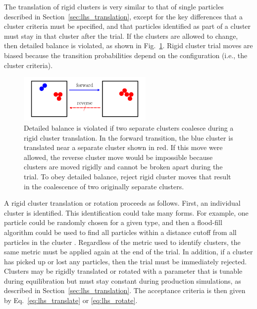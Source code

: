 \documentclass[
  9pt,
  bestpractices,
]{livecoms}
\begin{document}
The translation of rigid clusters is very similar to that of single particles described in Section~\ref{sec:lhs_translation}, except for the key differences that a cluster criteria must be specified, and that particles identified as part of a cluster must stay in that cluster after the trial.
If the clusters are allowed to change, then detailed balance is violated, as shown in Fig.~\ref{fig:cluster}.
Rigid cluster trial moves are biased because the transition probabilities depend on the configuration (i.e., the cluster criteria).

\begin{figure}
\begin{centering}
\includegraphics[width=6.5cm]{../figures/cluster.pdf}
\caption{
Detailed balance is violated if two separate clusters coalesce during a rigid cluster translation.
In the forward transition, the blue cluster is translated near a separate cluster shown in red.
If this move were allowed, the reverse cluster move would be impossible because clusters are moved rigidly and cannot be broken apart during the trial.
To obey detailed balance, reject rigid cluster moves that result in the coalescence of two originally separate clusters.
}
\label{fig:cluster}
\end{centering}
\end{figure}

A rigid cluster translation or rotation proceeds as follows.
First, an individual cluster is identified.
This identification could take many forms.
For example, one particle could be randomly chosen for a given type, and then a flood-fill algorithm could be used to find all particles within a distance cutoff from all particles in the cluster \cite{hatch_self-assembly_2016}.
Regardless of the metric used to identify clusters, the same metric must be applied again at the end of the trial.
In addition, if a cluster has picked up or lost any particles, then the trial must be immediately rejected.
Clusters may be rigidly translated or rotated with a parameter that is tunable during equilibration but must stay constant during production simulations, as described in Section~\ref{sec:lhs_translation}.
The acceptance criteria is then given by Eq.~\ref{eq:lhs_translate} or \ref{eq:lhs_rotate}.
\end{document}
